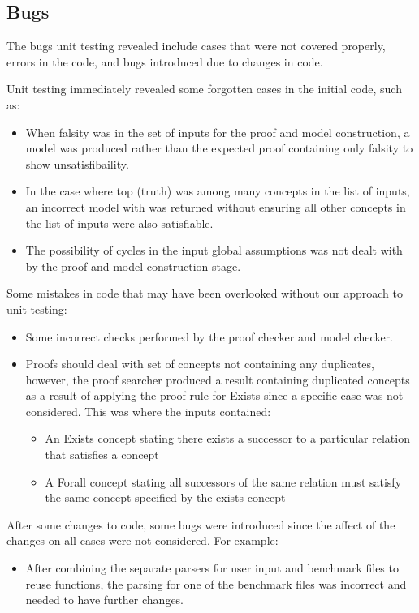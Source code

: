\subsection*{Bugs}
The bugs unit testing revealed include cases that were not covered properly, errors in the code, and bugs introduced due to changes in code.

Unit testing immediately revealed some forgotten cases in the initial code, such as:
\begin{itemize}
\item When falsity was in the set of inputs for the proof and model construction, a model was produced rather than the expected proof containing only falsity to show unsatisfibaility.
\item In the case where top (truth) was among many concepts in the list of inputs, an incorrect model with was returned without ensuring all other concepts in the list of inputs were also satisfiable.
\item The possibility of cycles in the input global assumptions was not dealt with by the proof and model construction stage.
\end{itemize}

Some mistakes in code that may have been overlooked without our approach to unit testing:
\begin{itemize}
\item Some incorrect checks performed by the proof checker and model checker.
\item Proofs should deal with set of concepts not containing any duplicates, however, the proof searcher produced a result containing duplicated concepts as a result of applying the proof rule for Exists since a specific case was not considered. This was where the inputs contained:
  \begin{itemize}
    \item An Exists concept stating there exists a successor to a particular relation that satisfies a concept
    \item A Forall concept stating all successors of the same relation must satisfy the same concept specified by the exists concept
  \end{itemize}
\end{itemize}

After some changes to code, some bugs were introduced since the affect of the changes on all cases were not considered. For example:
\begin{itemize}
\item After combining the separate parsers for user input and benchmark files to reuse functions, the parsing for one of the benchmark files was incorrect and needed to have further changes. 
\end{itemize}

